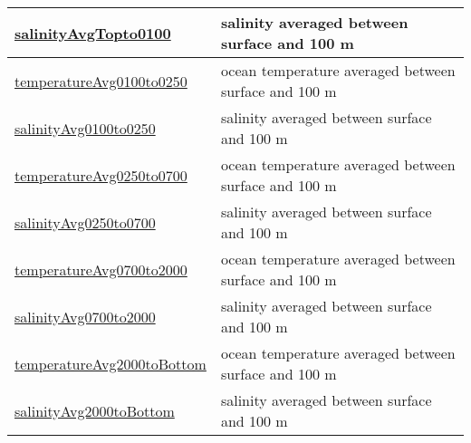 {\begin{center}
\begin{longtable}{| p{2.0in} | p{4.0in} |}
    \hline
    \hyperref[subsec:var_sec_highFrequencyOutputAM_salinityAvgTopto0100]{salinityAvgTopto0100} & salinity averaged between surface and 100 m \\
    \hline
    \hyperref[subsec:var_sec_highFrequencyOutputAM_temperatureAvg0100to0250]{temperatureAvg0100to0250} & ocean temperature averaged between surface and 100 m \\
    \hline
    \hyperref[subsec:var_sec_highFrequencyOutputAM_salinityAvg0100to0250]{salinityAvg0100to0250} & salinity averaged between surface and 100 m \\
    \hline
    \hyperref[subsec:var_sec_highFrequencyOutputAM_temperatureAvg0250to0700]{temperatureAvg0250to0700} & ocean temperature averaged between surface and 100 m \\
    \hline
    \hyperref[subsec:var_sec_highFrequencyOutputAM_salinityAvg0250to0700]{salinityAvg0250to0700} & salinity averaged between surface and 100 m \\
    \hline
    \hyperref[subsec:var_sec_highFrequencyOutputAM_temperatureAvg0700to2000]{temperatureAvg0700to2000} & ocean temperature averaged between surface and 100 m \\
    \hline
    \hyperref[subsec:var_sec_highFrequencyOutputAM_salinityAvg0700to2000]{salinityAvg0700to2000} & salinity averaged between surface and 100 m \\
    \hline
    \hyperref[subsec:var_sec_highFrequencyOutputAM_temperatureAvg2000toBottom]{temperatureAvg2000toBottom} & ocean temperature averaged between surface and 100 m \\
    \hline
    \hyperref[subsec:var_sec_highFrequencyOutputAM_salinityAvg2000toBottom]{salinityAvg2000toBottom} & salinity averaged between surface and 100 m \\
    \hline
\end{longtable}
\end{center}
}
